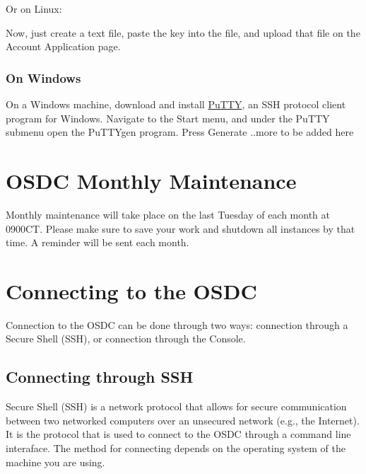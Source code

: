 \documentclass[letterpaper,10pt,english]{sphinxmanual}
\begin{document}
Or on Linux:
\begin{quote}


\end{quote}

Now, just create a text file, paste the key into the file, and upload that file on the Account Application page.


\subsubsection{On Windows}
\label{gettingstarted:on-windows}
On a Windows machine, download and install \href{http://www.chiark.greenend.org.uk/~sgtatham/putty/}{PuTTY}, an SSH protocol client program for Windows. Navigate to the Start menu, and under the PuTTY submenu open the PuTTYgen program. Press Generate
..more to be added here


\section{OSDC Monthly Maintenance}
\label{gettingstarted:osdc-monthly-maintenance}
Monthly maintenance will take place on the last Tuesday of each month at 0900CT. Please make sure to save your work and shutdown all instances by that time. A reminder will be sent each month.


\section{Connecting to the OSDC}
\label{gettingstarted:connecting-to-the-osdc}
Connection to the OSDC can be done through two ways: connection through a Secure Shell (SSH), or connection through the Console.


\subsection{Connecting through SSH}
\label{gettingstarted:connecting-through-ssh}
{\hfill}

Secure Shell (SSH) is a network protocol that allows for secure communication between two networked computers over an unsecured network (e.g., the Internet). It is the protocol that is used to connect to the OSDC through a command line interaface. The method for connecting depends on the operating system of the machine you are using.
\end{document}
